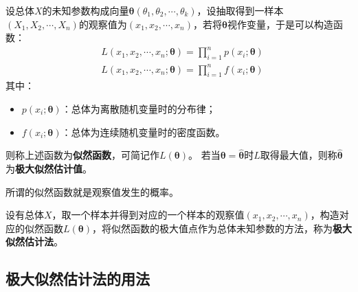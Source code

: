 \begin{definition}[似然函数]
设总体$X$的未知参数构成向量$\boldsymbol{\theta }\left( \theta _1,\theta _2,\cdots ,\theta _k \right) $，设抽取得到一样本$\left( X_1,X_2,\cdots ,X_n \right) $的观察值为$\left( x_1,x_2,\cdots ,x_n \right) $，若将$\boldsymbol{\theta }$视作变量，于是可以构造函数：
\begin{align*}
&L\left( x_1,x_2,\cdots ,x_n;\boldsymbol{\theta } \right) =\prod_{i=1}^n{p\left( x_i;\boldsymbol{\theta } \right)} \\
&L\left( x_1,x_2,\cdots ,x_n;\boldsymbol{\theta } \right) =\prod_{i=1}^n{f\left( x_i;\boldsymbol{\theta } \right)}
\end{align*}
其中：
\begin{itemize}
    \item $p\left( x_i;\boldsymbol{\theta } \right) $：总体为离散随机变量时的分布律；
    \item $f\left( x_i;\boldsymbol{\theta } \right) $：总体为连续随机变量时的密度函数。
\end{itemize}
则称上述函数为{\bf 似然函数}，可简记作$L\left( \boldsymbol{\theta } \right) $。
若当$\boldsymbol{\theta }=\boldsymbol{\hat{\theta}}$时$L$取得最大值，则称$\boldsymbol{\hat{\theta}}$为{\bf 极大似然估计值}。
\end{definition}

\begin{tcolorbox}
所谓的似然函数就是观察值发生的概率。
\end{tcolorbox}

\begin{definition}[极大似然估计法]
设有总体$X$，取一个样本并得到对应的一个样本的观察值$\left( x_1,x_2,\cdots ,x_n \right) $，构造对应的似然函数$L\left( \boldsymbol{\theta } \right) $，将似然函数的极大值点作为总体未知参数的方法，称为{\bf 极大似然估计法}。
\end{definition}

\subsection{极大似然估计法的用法}

